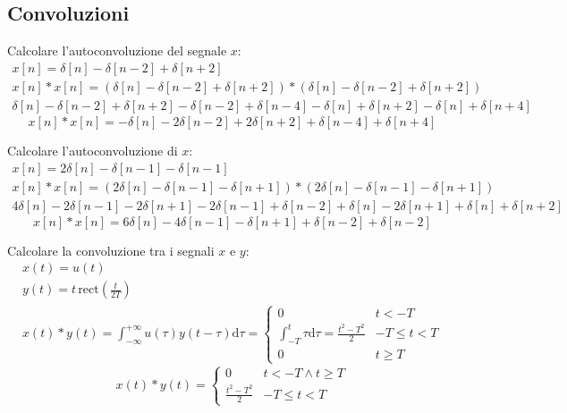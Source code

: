 \documentclass{article}
\newcommand{\rect}{\mbox{rect}}
\newcommand{\df}{\mathrm{d}}
\begin{document}
\subsection{Convoluzioni}

Calcolare l'autoconvoluzione del segnale $x$:
\begin{gather*}
    x[n]=\delta[n]-\delta[n-2]+\delta[n+2]\\
    x[n]*x[n]=(\delta[n]-\delta[n-2]+\delta[n+2])*(\delta[n]-\delta[n-2]+\delta[n+2])\\
    \delta[n]-\delta[n-2]+\delta[n+2]-\delta[n-2]+\delta[n-4]-\delta[n]+\delta[n+2]-\delta[n]+\delta[n+4]
\end{gather*}
\begin{equation}
    x[n]*x[n]=-\delta[n]-2\delta[n-2]+2\delta[n+2]+\delta[n-4]+\delta[n+4]
\end{equation}




Calcolare l'autoconvoluzione di $x$:
\begin{gather*}
    x[n]=2\delta[n]-\delta[n-1]-\delta[n-1]\\
    x[n]*x[n]=(2\delta[n]-\delta[n-1]-\delta[n+1])*(2\delta[n]-\delta[n-1]-\delta[n+1])\\
    4\delta[n]-2\delta[n-1]-2\delta[n+1]-2\delta[n-1]+\delta[n-2]+\delta[n]-2\delta[n+1]+\delta[n]+\delta[n+2]
\end{gather*}
\begin{equation}
    x[n]*x[n]=6\delta[n]-4\delta[n-1]-\delta[n+1]+\delta[n-2]+\delta[n-2]
\end{equation}



Calcolare la convoluzione tra i segnali $x$ e $y$:
\begin{gather*}
    x(t)=u(t)\\
    y(t)=t\,\rect\displaystyle\left(\frac{t}{2T}\right)\\
    x(t)*y(t)=\displaystyle\int_{-\infty}^{+\infty}u(\tau)y(t-\tau)\df\tau=\begin{cases}
        0&t<-T\\
        \displaystyle\int_{-T}^{t}\tau \df\tau=\frac{t^2-T^2}{2}&-T\leq t<T\\
        0& t\geq T
    \end{cases}
\end{gather*}
\begin{equation}
    x(t)*y(t)=\begin{cases}
        0& t<-T\land t\geq T\\
        \displaystyle\frac{t^2-T^2}{2}&-T\leq t<T
    \end{cases}
\end{equation}
\end{document}
